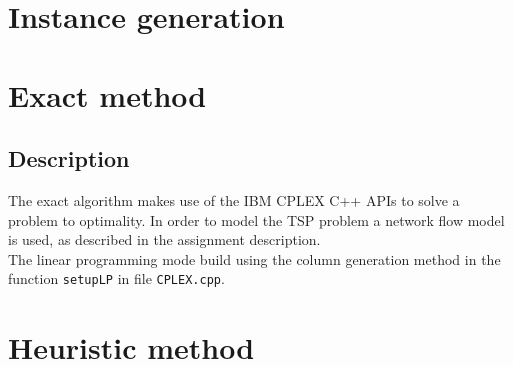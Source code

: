 
\section{Instance generation}

\section{Exact method}
\label{chap:cplexm}
\subsection{Description}
The exact algorithm makes use of the IBM CPLEX C++ APIs to solve a problem to optimality. In order to model the TSP problem a network flow model is used, as described in the assignment description. \\
The linear programming mode build using the column generation method in the function \texttt{setupLP} in file \texttt{CPLEX.cpp}.



\section{Heuristic method}
\label{chap:heuris}
